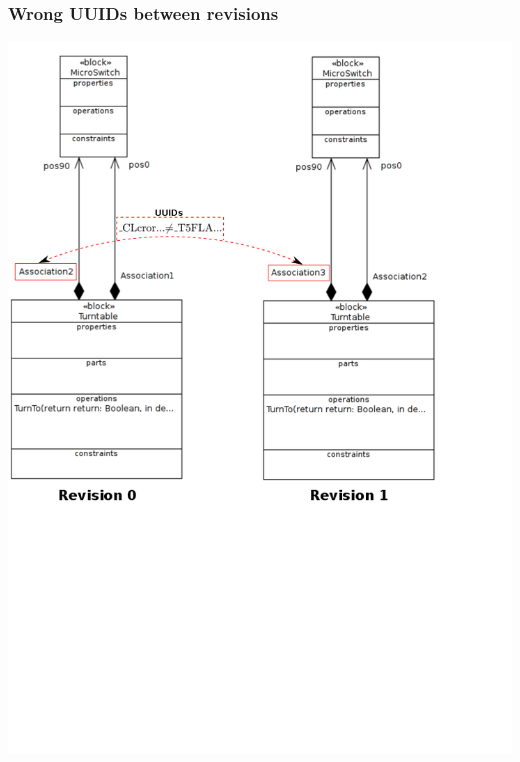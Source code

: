 \documentclass[10pt]{beamer}
\begin{document}
\begin{frame}
\frametitle{Wrong UUIDs between revisions}
\begin{center}
\includegraphics[scale=0.33]{wrongUUIDs_examples_p3}\\
\end{center}

\end{frame}
\end{document}
